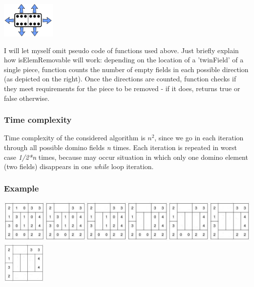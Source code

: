   \begin{center}
    \includegraphics[width=0.2\textwidth]{dirPiece.png}
  \end{center}

I will let myself omit pseudo code of functions used above. Just briefly explain how isElemRemovable
will work: depending on the location of a 'twinField' of a single piece, function counts the number
of empty fields in each possible direction (as depicted on the right). Once the directions are
counted, function checks if they meet requirements for the piece to be removed - if it does, returns
true or false otherwise.

\subsubsection{Time complexity}
Time complexity of the considered algorithm is \textit{$n^2$}, since we go in each iteration 
through all possible domino fields \textit{n} times. Each iteration is repeated in worst case
\textit{1/2*n} times, because may occur situation in which only one domino element (two fields)
disappears in one \textit{while} loop iteration.

\subsubsection{Example}

\includegraphics[width=1\textwidth]{board1.jpg} \\
\includegraphics[width=0.163\textwidth]{board2.jpg}
